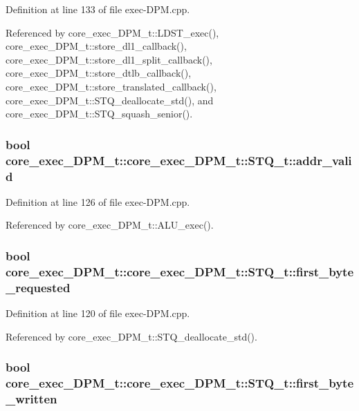 Definition at line 133 of file exec-DPM.cpp.

Referenced by core\_\-exec\_\-DPM\_\-t::LDST\_\-exec(), core\_\-exec\_\-DPM\_\-t::store\_\-dl1\_\-callback(), core\_\-exec\_\-DPM\_\-t::store\_\-dl1\_\-split\_\-callback(), core\_\-exec\_\-DPM\_\-t::store\_\-dtlb\_\-callback(), core\_\-exec\_\-DPM\_\-t::store\_\-translated\_\-callback(), core\_\-exec\_\-DPM\_\-t::STQ\_\-deallocate\_\-std(), and core\_\-exec\_\-DPM\_\-t::STQ\_\-squash\_\-senior().
\subsubsection[{addr\_\-valid}]{\setlength{\rightskip}{0pt plus 5cm}bool core\_\-exec\_\-DPM\_\-t::core\_\-exec\_\-DPM\_\-t::STQ\_\-t::addr\_\-valid}\label{structcore__exec__DPM__t_1_1STQ__t_467417274abd61110c78ce4b279e924e}




Definition at line 126 of file exec-DPM.cpp.

Referenced by core\_\-exec\_\-DPM\_\-t::ALU\_\-exec().
\subsubsection[{first\_\-byte\_\-requested}]{\setlength{\rightskip}{0pt plus 5cm}bool core\_\-exec\_\-DPM\_\-t::core\_\-exec\_\-DPM\_\-t::STQ\_\-t::first\_\-byte\_\-requested}\label{structcore__exec__DPM__t_1_1STQ__t_9bcbb2b9abc5c2f3efe77419f003796b}




Definition at line 120 of file exec-DPM.cpp.

Referenced by core\_\-exec\_\-DPM\_\-t::STQ\_\-deallocate\_\-std().
\subsubsection[{first\_\-byte\_\-written}]{\setlength{\rightskip}{0pt plus 5cm}bool core\_\-exec\_\-DPM\_\-t::core\_\-exec\_\-DPM\_\-t::STQ\_\-t::first\_\-byte\_\-written}\label{structcore__exec__DPM__t_1_1STQ__t_d90106f07a571dbfecd4586aa92d0838}




